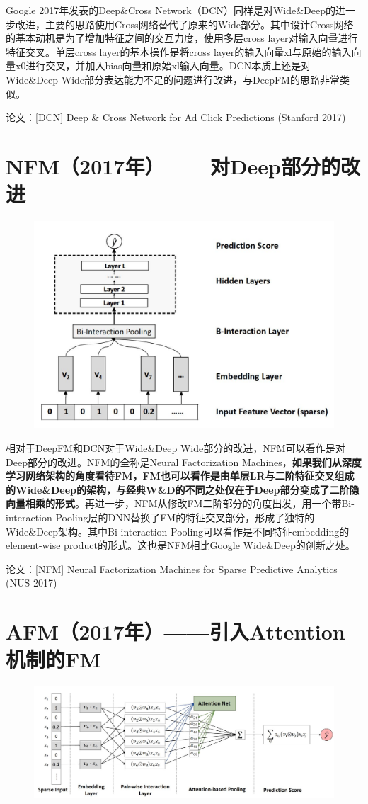 \documentclass[12pt]{article}
\begin{document}
Google 2017年发表的Deep\&Cross Network（DCN）同样是对Wide\&Deep的进一步改进，主要的思路使用Cross网络替代了原来的Wide部分。其中设计Cross网络的基本动机是为了增加特征之间的交互力度，使用多层cross layer对输入向量进行特征交叉。单层cross layer的基本操作是将cross layer的输入向量xl与原始的输入向量x0进行交叉，并加入bias向量和原始xl输入向量。DCN本质上还是对Wide\&Deep Wide部分表达能力不足的问题进行改进，与DeepFM的思路非常类似。

论文：[DCN] Deep \& Cross Network for Ad Click Predictions (Stanford 2017)

\section{NFM（2017年）——对Deep部分的改进}
\begin{figure}[H]
    \centering
    \includegraphics[width=.8\textwidth]{fig/NFM_Structure.jpg}
\end{figure}

相对于DeepFM和DCN对于Wide\&Deep Wide部分的改进，NFM可以看作是对Deep部分的改进。NFM的全称是Neural Factorization Machines，\textbf{如果我们从深度学习网络架构的角度看待FM，FM也可以看作是由单层LR与二阶特征交叉组成的Wide\&Deep的架构，与经典W\&D的不同之处仅在于Deep部分变成了二阶隐向量相乘的形式}。再进一步，NFM从修改FM二阶部分的角度出发，用一个带Bi-interaction Pooling层的DNN替换了FM的特征交叉部分，形成了独特的Wide\&Deep架构。其中Bi-interaction Pooling可以看作是不同特征embedding的element-wise product的形式。这也是NFM相比Google Wide\&Deep的创新之处。

论文：[NFM] Neural Factorization Machines for Sparse Predictive Analytics (NUS 2017)

\section{AFM（2017年）——引入Attention机制的FM}
\begin{figure}[H]
    \centering
    \includegraphics[width=.8\textwidth]{fig/AFM_Structure.jpg}
\end{figure}
\end{document}
